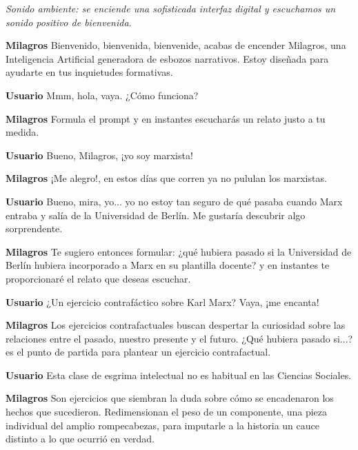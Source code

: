 \documentclass[
  spanish,
  11pt,
  a4paper,
]{scrbook}
\newenvironment{transcripcion}{
    \begin{list}{}{
        \setlength{\leftmargin}{1.5em}  %
        \setlength{\rightmargin}{0em}
        \setlength{\itemsep}{0.2em}     %
        \setlength{\parsep}{0.0em}
        \setlength{\listparindent}{0pt}
    }
}{
    \end{list}
}
\newcommand{\personaje}[1]{\textbf{#1}\quad}
\newcommand{\escena}[1]{\textit{\small #1}\par\vspace{0.4em}}
\begin{document}
\begin{transcripcion}
\item \escena{Sonido ambiente: se enciende una sofisticada interfaz digital y escuchamos un sonido positivo de bienvenida.}

\item \personaje{Milagros} Bienvenido, bienvenida, bienvenide, acabas de encender Milagros, una Inteligencia Artificial generadora de esbozos narrativos. Estoy diseñada para ayudarte en tus inquietudes formativas.

\item \personaje{Usuario} Mmm, hola, vaya. ¿Cómo funciona?

\item \personaje{Milagros} Formula el prompt y en instantes escucharás un relato justo a tu medida.

\item \personaje{Usuario} Bueno, Milagros, ¡yo soy marxista!

\item \personaje{Milagros} ¡Me alegro!, en estos días que corren ya no pululan los marxistas.

\item \personaje{Usuario} Bueno, mira, yo... yo no estoy tan seguro de qué pasaba cuando Marx entraba y salía de la Universidad de Berlín. Me gustaría descubrir algo sorprendente.

\item \personaje{Milagros} Te sugiero entonces formular: ¿qué hubiera pasado si la Universidad de Berlín hubiera incorporado a Marx en su plantilla docente? y en instantes te proporcionaré el relato que deseas escuchar.

\item \personaje{Usuario} ¿Un ejercicio contrafáctico sobre Karl Marx? Vaya, ¡me encanta!

\item \personaje{Milagros} Los ejercicios contrafactuales buscan despertar la curiosidad sobre las relaciones entre el pasado, nuestro presente y el futuro. ¿Qué hubiera pasado si...? es el punto de partida para plantear un ejercicio contrafactual.

\item \personaje{Usuario} Esta clase de esgrima intelectual no es habitual en las Ciencias Sociales.

\item \personaje{Milagros} Son ejercicios que siembran la duda sobre cómo se encadenaron los hechos que sucedieron. Redimensionan el peso de un componente, una pieza individual del amplio rompecabezas, para imputarle a la historia un cauce distinto a lo que ocurrió en verdad.


\end{transcripcion}
\end{document}

